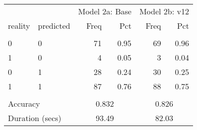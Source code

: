\begin{tabular}{llrrrr}
   \toprule 
 & & 
                        \multicolumn{2}{l}{Model 2a: Base} &
                        \multicolumn{2}{l}{Model 2b: v12} 
                        \\ 
 \cmidrule(lr){3-4} 
                        \cmidrule(lr){5-6} 
                        
  reality & predicted & 
                        Freq & Pct &
                        Freq & Pct 
                        \\ \hline \\[-1.8ex]  
 0 & 0 &  71 & 0.95 &  69 & 0.96 \\ 
  1 & 0 &   4 & 0.05 &   3 & 0.04 \\ 
  0 & 1 &  28 & 0.24 &  30 & 0.25 \\ 
  1 & 1 &  87 & 0.76 &  88 & 0.75 \\ 
   \hline \\[-1.8ex]  

              \multicolumn{2}{l}{Accuracy} & 
                   \multicolumn{2}{c}{0.832} &
                   \multicolumn{2}{c}{0.826}
                   \\ 
 
                   \multicolumn{2}{l}{Duration (secs)} & 
                   \multicolumn{2}{c}{93.49} &
                   \multicolumn{2}{c}{82.03}
                   \\ 
 \bottomrule 
\end{tabular}
